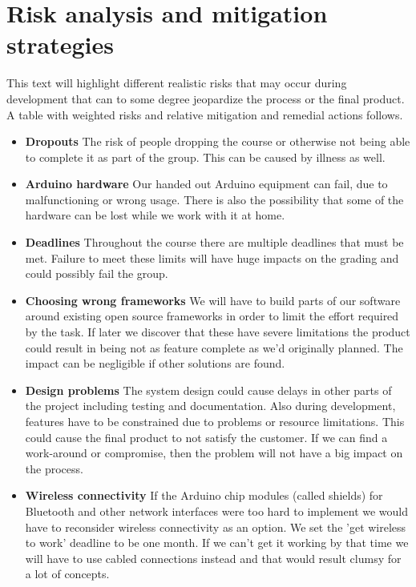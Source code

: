 \section{Risk analysis and mitigation strategies}

This text will highlight different realistic risks that may occur during development
that can to some degree jeopardize the process or the final product.
A table with weighted risks and relative mitigation and remedial actions follows.

\begin{itemize}

	\item \textbf{Dropouts}\newline
		The risk of people dropping the course or otherwise not being able to complete it as part
		of the group. This can be caused by illness as well.

	\item \textbf{Arduino hardware}\newline
		Our handed out Arduino equipment can fail, due to malfunctioning or wrong usage.
		There is also the possibility that some of the hardware can be lost while we work with it at home.

	\item \textbf{Deadlines}\newline
		Throughout the course there are multiple deadlines that must be met. Failure to meet
		these limits will have huge impacts on the grading and could possibly fail the group.

	\item \textbf{Choosing wrong frameworks}\newline
		We will have to build parts of our software around existing open source frameworks in order to limit the effort
		required by the task. If later we discover that these have severe limitations the product could result in
		being not as feature complete as we'd originally planned. The impact can be negligible if other solutions are found.

	\item \textbf{Design problems}\newline
		The system design could cause delays in other parts of the project
		including testing and documentation. Also during development, features have to be constrained due to problems
		or resource limitations. This could cause the final product to not satisfy the customer.
		If we can find a work-around or compromise, then the problem will not have a big impact on the process.

	\item \textbf{Wireless connectivity}\newline
		If the Arduino chip modules (called shields) for Bluetooth and other network interfaces were too
		hard to implement we would have to reconsider wireless connectivity as an option.
		We set the 'get wireless to work' deadline to be one month. If we can't get it working
		by that time we will have to use cabled connections instead and that would result clumsy
	for a lot of concepts.
\end{itemize}

